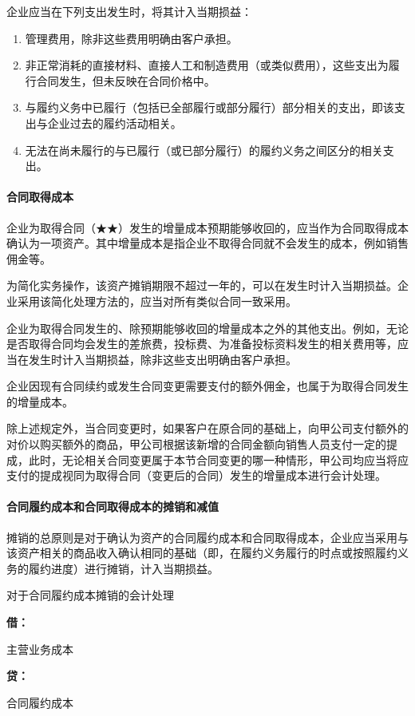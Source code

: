 \documentclass[UTF8,12pt]{ctexart}
\newenvironment{Dr}{%
	\begin{list}{}%
		{
			\setlength{\leftmargin}{2em}
			\setlength{\labelwidth}{2em}
			\setlength{\labelsep}{0pt}
			\setlength{\itemindent}{0pt}
			\setlength{\listparindent}{0pt}
			\setlength{\parsep}{0pt}
			\setlength{\topsep}{0pt}
		}
		\item[\textbf{借：}]
	}{%
	\end{list}
}
\newenvironment{Cr}{%
	\begin{list}{}%
		{
			\setlength{\leftmargin}{2em}
			\setlength{\labelwidth}{2em}
			\setlength{\labelsep}{0pt}
			\setlength{\itemindent}{0pt}
			\setlength{\listparindent}{0pt}
			\setlength{\parsep}{0pt}
			\setlength{\topsep}{0pt}
		}
		\item[\textbf{贷：}]
	}{%
	\end{list}
}
\numberwithin{equation}{section} %
\numberwithin{figure}{section}
\numberwithin{table}{section}
\begin{document}
	企业应当在下列支出发生时，将其计入当期损益：
	\begin{enumerate}
		\item 管理费用，除非这些费用明确由客户承担。
		
		\item 非正常消耗的直接材料、直接人工和制造费用（或类似费用），这些支出为履行合同发生，但未反映在合同价格中。
		
		\item 与履约义务中已履行（包括已全部履行或部分履行）部分相关的支出，即该支出与企业过去的履约活动相关。
		
		\item 无法在尚未履行的与已履行（或已部分履行）的履约义务之间区分的相关支出。
	\end{enumerate}
	
	\paragraph{合同取得成本}
	企业为取得合同（★★）发生的增量成本预期能够收回的，应当作为合同取得成本确认为一项资产。其中增量成本是指企业不取得合同就不会发生的成本，例如销售佣金等。
	
	为简化实务操作，该资产摊销期限不超过一年的，可以在发生时计入当期损益。企业采用该简化处理方法的，应当对所有类似合同一致采用。
	
	企业为取得合同发生的、除预期能够收回的增量成本之外的其他支出。例如，无论是否取得合同均会发生的差旅费，投标费、为准备投标资料发生的相关费用等，应当在发生时计入当期损益，除非这些支出明确由客户承担。
	
	企业因现有合同续约或发生合同变更需要支付的额外佣金，也属于为取得合同发生的增量成本。
	
	除上述规定外，当合同变更时，如果客户在原合同的基础上，向甲公司支付额外的对价以购买额外的商品，甲公司根据该新增的合同金额向销售人员支付一定的提成，此时，无论相关合同变更属于本节合同变更的哪一种情形，甲公司均应当将应支付的提成视同为取得合同（变更后的合同）发生的增量成本进行会计处理。
	
	\paragraph{合同履约成本和合同取得成本的摊销和减值}
	
	摊销的总原则是对于确认为资产的合同履约成本和合同取得成本，企业应当采用与该资产相关的商品收入确认相同的基础（即，在履约义务履行的时点或按照履约义务的履约进度）进行摊销，计入当期损益。
	
	对于合同履约成本摊销的会计处理
	\begin{Dr}
		主营业务成本
	\end{Dr}
	\begin{Cr}
		合同履约成本
	\end{Cr}
	
\end{document}
